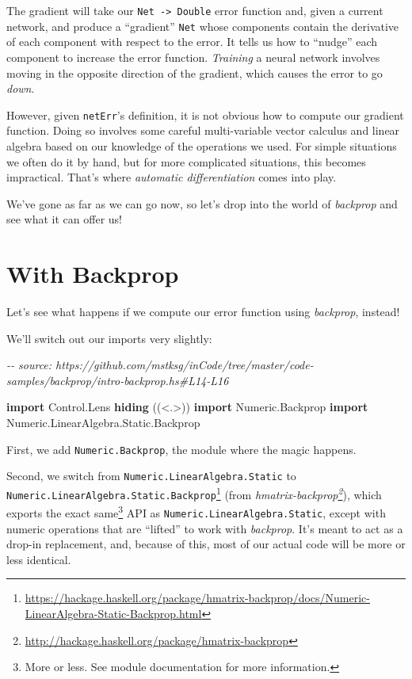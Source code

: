 \documentclass[]{article}
\newenvironment{Shaded}{}{}
\newcommand{\CommentTok}[1]{\textcolor[rgb]{0.38,0.63,0.69}{\textit{#1}}}
\newcommand{\DataTypeTok}[1]{\textcolor[rgb]{0.56,0.13,0.00}{#1}}
\newcommand{\KeywordTok}[1]{\textcolor[rgb]{0.00,0.44,0.13}{\textbf{#1}}}
\newcommand{\NormalTok}[1]{#1}
\renewcommand{\href}[2]{#2\footnote{\url{#1}}}
\begin{document}
The gradient will take our \texttt{Net\ -\textgreater{}\ Double} error function
and, given a current network, and produce a ``gradient'' \texttt{Net} whose
components contain the derivative of each component with respect to the error.
It tells us how to ``nudge'' each component to increase the error function.
\emph{Training} a neural network involves moving in the opposite direction of
the gradient, which causes the error to go \emph{down}.

However, given \texttt{netErr}'s definition, it is not obvious how to compute
our gradient function. Doing so involves some careful multi-variable vector
calculus and linear algebra based on our knowledge of the operations we used.
For simple situations we often do it by hand, but for more complicated
situations, this becomes impractical. That's where \emph{automatic
differentiation} comes into play.

We've gone as far as we can go now, so let's drop into the world of
\emph{backprop} and see what it can offer us!

\section{With Backprop}\label{with-backprop}

Let's see what happens if we compute our error function using \emph{backprop},
instead!

We'll switch out our imports very slightly:

\begin{Shaded}
\begin{Highlighting}[]
\CommentTok{{-}{-} source: https://github.com/mstksg/inCode/tree/master/code{-}samples/backprop/intro{-}backprop.hs\#L14{-}L16}

\KeywordTok{import}           \DataTypeTok{Control.Lens} \KeywordTok{hiding}\NormalTok{                   ((\textless{}.\textgreater{}))}
\KeywordTok{import}           \DataTypeTok{Numeric.Backprop}
\KeywordTok{import}           \DataTypeTok{Numeric.LinearAlgebra.Static.Backprop}
\end{Highlighting}
\end{Shaded}

First, we add \texttt{Numeric.Backprop}, the module where the magic happens.

Second, we switch from \texttt{Numeric.LinearAlgebra.Static} to
\href{https://hackage.haskell.org/package/hmatrix-backprop/docs/Numeric-LinearAlgebra-Static-Backprop.html}{\texttt{Numeric.LinearAlgebra.Static.Backprop}}
(from
\emph{\href{http://hackage.haskell.org/package/hmatrix-backprop}{hmatrix-backprop}}),
which exports the exact same\footnote{More or less. See module documentation for
  more information.} API as \texttt{Numeric.LinearAlgebra.Static}, except with
numeric operations that are ``lifted'' to work with \emph{backprop}. It's meant
to act as a drop-in replacement, and, because of this, most of our actual code
will be more or less identical.
\end{document}
